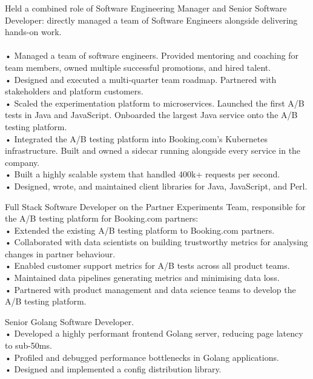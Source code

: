 \documentclass[11pt,a4paper]{moderncv-xetex}
\begin{document}
{
Held a combined role of Software Engineering Manager and Senior Software Developer: directly managed a team of Software Engineers alongside delivering hands-on work.
\\
\\
• Managed a team of software engineers. Provided mentoring and coaching for team members, owned multiple successful promotions, and hired talent.
\\
• Designed and executed a multi-quarter team roadmap. Partnered with stakeholders and platform customers.
\\
• Scaled the experimentation platform to microservices. Launched the first A/B tests in Java and JavaScript. Onboarded the largest Java service onto the A/B testing platform.
\\
• Integrated the A/B testing platform into Booking.com's Kubernetes infrastructure. Built and owned a sidecar running alongside every service in the company.
\\
• Built a highly scalable system that handled 400k+ requests per second.
\\
• Designed, wrote, and maintained client libraries for Java, JavaScript, and Perl.
}


{
Full Stack Software Developer on the Partner Experiments Team, responsible for the A/B testing platform for Booking.com partners:
\\
• Extended the existing A/B testing platform to Booking.com partners.
\\
• Collaborated with data scientists on building trustworthy metrics for analysing changes in partner behaviour.
\\
• Enabled customer support metrics for A/B tests across all product teams.
\\
• Maintained data pipelines generating metrics and minimising data loss.
\\
• Partnered with product management and data science teams to develop the A/B testing platform.
}
    
{
Senior Golang Software Developer.
\\
• Developed a highly performant frontend Golang server, reducing page latency to sub-50ms.
\\
• Profiled and debugged performance bottlenecks in Golang applications.
\\
• Designed and implemented a config distribution library.
}
    
\end{document}
